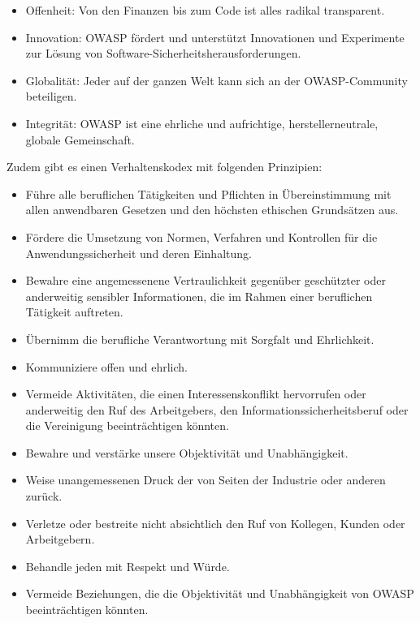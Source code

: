 \documentclass[12pt,oneside,a4paper,parskip]{scrbook}
\begin{document}
  \begin{itemize}
    \item Offenheit: Von den Finanzen bis zum Code ist alles radikal transparent.
    \item Innovation: OWASP fördert und unterstützt Innovationen und Experimente zur Lösung von Software-Sicherheitsherausforderungen.
    \item Globalität: Jeder auf der ganzen Welt kann sich an der OWASP-Community beteiligen.
    \item Integrität: OWASP ist eine ehrliche und aufrichtige, herstellerneutrale, globale Gemeinschaft.
  \end{itemize}

  Zudem gibt es einen Verhaltenskodex mit folgenden Prinzipien:
  \begin{itemize}
    \item Führe alle beruflichen Tätigkeiten und Pflichten in Übereinstimmung mit allen anwendbaren Gesetzen und den höchsten ethischen Grundsätzen aus.
    \item Fördere die Umsetzung von Normen, Verfahren und Kontrollen für die Anwendungssicherheit und deren Einhaltung.
    \item Bewahre eine angemessenene Vertraulichkeit gegenüber geschützter oder anderweitig sensibler Informationen, die im Rahmen einer beruflichen Tätigkeit auftreten.
    \item Übernimm die berufliche Verantwortung mit Sorgfalt und Ehrlichkeit.
    \item Kommuniziere offen und ehrlich.
    \item Vermeide Aktivitäten, die einen Interessenskonflikt hervorrufen oder anderweitig den Ruf des Arbeitgebers, den Informationssicherheitsberuf oder die Vereinigung beeinträchtigen könnten.
    \item Bewahre und verstärke unsere Objektivität und Unabhängigkeit.
    \item Weise unangemessenen Druck der von Seiten der Industrie oder anderen zurück.
    \item Verletze oder bestreite nicht absichtlich den Ruf von Kollegen, Kunden oder Arbeitgebern.
    \item Behandle jeden mit Respekt und Würde.
    \item Vermeide Beziehungen, die die Objektivität und Unabhängigkeit von OWASP  beeinträchtigen könnten.
  \end{itemize}

\cite{OWASPabout}
\end{document}
